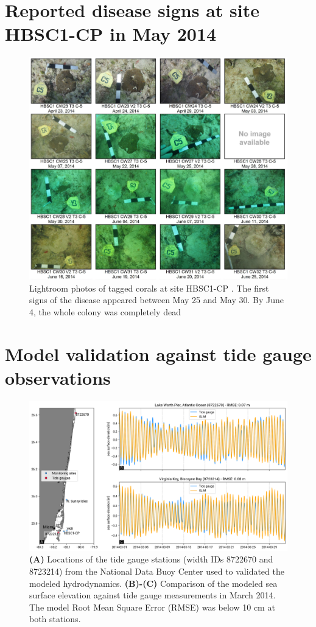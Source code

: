 \documentclass[preprint,12pt,authoryear]{elsarticle}
\begin{document}
\section{Reported disease signs at site HBSC1-CP in May 2014}\label{onset:appendice}
\begin{figure}[h!]
	\centering
	\includegraphics[width=\textwidth]{figures/hbsc1_cp.png}
	\caption{Lightroom photos of tagged corals at site HBSC1-CP \citep{dial2017}. The first signs of the disease appeared between May 25 and May 30. By June 4, the whole colony was completely dead}
\end{figure}
\newpage
\section{Model validation against tide gauge observations}\label{onset:validation}
\begin{figure}[h!]
    \centering
	\includegraphics[width=\textwidth]{figures/fig_validation_new.png}
    \caption{\textbf{(A)} Locations of the tide gauge stations (width IDs 8722670 and 8723214) from the National Data Buoy Center used to validated the modeled hydrodynamics. \textbf{(B)-(C)} Comparison of the modeled sea surface elevation against tide gauge measurements in March 2014. The model Root Mean Square Error (RMSE) was below 10 cm at both stations.
}\end{figure}
\end{document}
